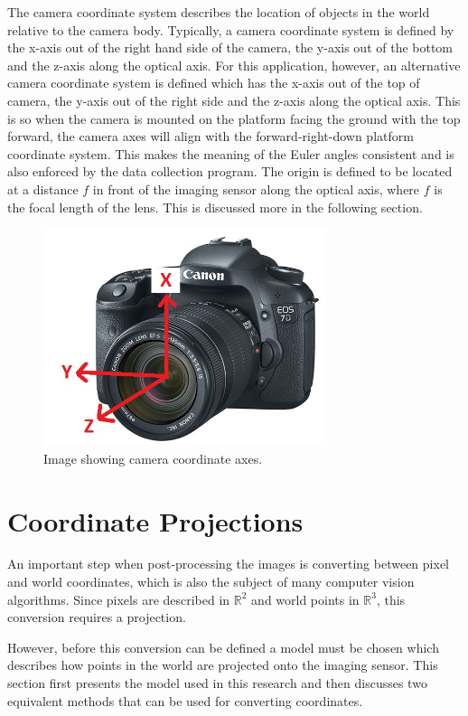 The camera coordinate system describes the location of objects in the world relative to the camera body.  Typically, a camera coordinate system is defined by the x-axis out of the right hand side of the camera, the y-axis out of the bottom and the z-axis along the optical axis.  For this application, however, an alternative camera coordinate system is defined which has the x-axis out of the top of camera, the y-axis out of the right side and the z-axis along the optical axis.  This is so when the camera is mounted on the platform facing the ground with the top forward, the camera axes will align with the forward-right-down platform coordinate system.  This makes the meaning of the Euler angles consistent and is also enforced by the data collection program.  The origin is defined to be located at a distance $f$ in front of the imaging sensor along the optical axis, where $f$ is the focal length of the lens.  This is discussed more in the following section.

\begin{figure}
	\centering
    \includegraphics[height=2.5in]{figures/camera_frame_canon.jpg}
    \caption[Camera coordinate frame]{Image showing camera coordinate axes.}
    \label{figure:camera_axes}
\end{figure}

\section{Coordinate Projections}
 
 An important step when post-processing the images is converting between pixel and world coordinates, which is also the subject of many computer vision algorithms.  Since pixels are described in $\mathbb{R}^2$ and world points in $\mathbb{R}^3$, this conversion requires a projection.  
 
 However, before this conversion can be defined a model must be chosen which describes how points in the world are projected onto the imaging sensor.  This section first presents the model used in this research and then discusses two equivalent methods that can be used for converting coordinates.  
 
